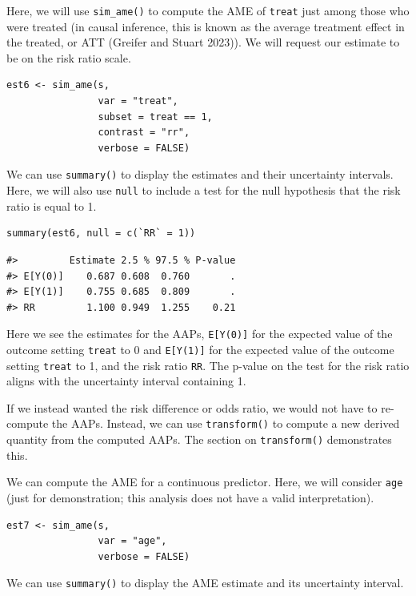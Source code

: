 Here, we will use \texttt{sim\_ame()} to compute the AME of \texttt{treat} just among those who were treated (in causal inference, this is known as the average treatment effect in the treated, or ATT (Greifer and Stuart 2023)). We will request our estimate to be on the risk ratio scale.

\begin{verbatim}
est6 <- sim_ame(s,
                var = "treat",
                subset = treat == 1,
                contrast = "rr",
                verbose = FALSE)
\end{verbatim}

We can use \texttt{summary()} to display the estimates and their uncertainty intervals. Here, we will also use \texttt{null} to include a test for the null hypothesis that the risk ratio is equal to 1.

\begin{verbatim}
summary(est6, null = c(`RR` = 1))
\end{verbatim}

\begin{verbatim}
#>         Estimate 2.5 % 97.5 % P-value
#> E[Y(0)]    0.687 0.608  0.760       .
#> E[Y(1)]    0.755 0.685  0.809       .
#> RR         1.100 0.949  1.255    0.21
\end{verbatim}

Here we see the estimates for the AAPs, \texttt{E{[}Y(0){]}} for the expected value of the outcome setting \texttt{treat} to 0 and \texttt{E{[}Y(1){]}} for the expected value of the outcome setting \texttt{treat} to 1, and the risk ratio \texttt{RR}. The p-value on the test for the risk ratio aligns with the uncertainty interval containing 1.

If we instead wanted the risk difference or odds ratio, we would not have to re-compute the AAPs. Instead, we can use \texttt{transform()} to compute a new derived quantity from the computed AAPs. The section on \texttt{transform()} demonstrates this.

We can compute the AME for a continuous predictor. Here, we will consider \texttt{age} (just for demonstration; this analysis does not have a valid interpretation).

\begin{verbatim}
est7 <- sim_ame(s,
                var = "age",
                verbose = FALSE)
\end{verbatim}

We can use \texttt{summary()} to display the AME estimate and its uncertainty interval.

